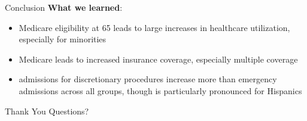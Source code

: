 \documentclass[aspectratio=169,professionalfonts]{beamer}
\newcommand{\hl}[1]{\textbf{\textcolor{UGARed}{#1}}}
\begin{document}
\begin{frame}{Conclusion}
  \hl{What we learned}:
  \begin{itemize}
    \item Medicare eligibility at 65 leads to large increases in healthcare utilization, especially for minorities
    \item Medicare leads to increased insurance coverage, especially multiple coverage
    \item admissions for discretionary procedures increase more than emergency admissions across all groups, though is particularly pronounced for Hispanics
  \end{itemize}
\end{frame}

\begin{frame}{Thank You}
  \centering
  \Large Questions?
\end{frame}
\end{document}
